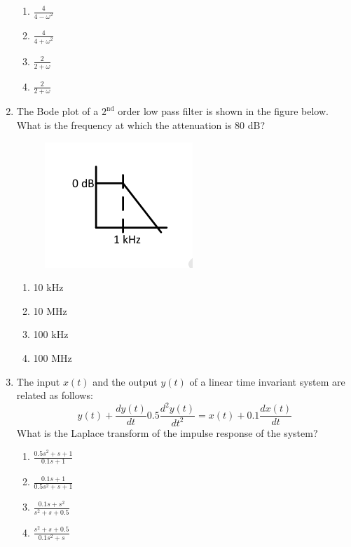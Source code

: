 \documentclass[a4paper,12pt]{exam}
\numberwithin{equation}{enumi}
\numberwithin{figure}{enumi}
\begin{document}
\begin{enumerate}
\hfill{}

\begin{multicols}{4}
\begin{enumerate}
\item $\frac{4}{4 - \omega^2}$
\item$\frac{4}{4 + \omega^2}$
\item $\frac{2}{2 + \omega}$
\item $\frac{2}{2 + \omega}$
\end{enumerate} 
\end{multicols}

\item The Bode plot of a $2^{\text{nd}}$ order low pass filter is shown in the figure below. What is the frequency at which the attenuation is 80 dB?

\begin{figure}[H]
\centering
\includegraphics[width=0.3\columnwidth]{figs/Q23.png}
\label{fig:Q23.png}
\end{figure}

\hfill{}

\begin{enumerate}
\item 10 kHz
\item 10 MHz
\item 100 kHz 
\item 100 MHz
\end{enumerate}  

\item The input $x(t)$ and the output $y(t)$ of a linear time invariant system are related as 
follows: \\[3pt]
\begin{equation*}
y(t) + \frac{dy(t)}{dt} 0.5\frac{d^2y(t)}{dt^2} = x(t) + 0.1\frac{dx(t)}{dt} 
\end{equation*}
What is the Laplace transform of the impulse response of the system? 

\hfill{}

\begin{enumerate}
\item $\frac{0.5s^2 + s + 1}{0.1s + 1}$
\vspace{0.25cm}
\item $\frac{0.1s + 1}{0.5s^2 + s + 1}$
\vspace{0.25cm}
\item $\frac{0.1s + s^2}{s^2 + s + 0.5}$
\vspace{0.25cm}
\item $\frac{s^2 + s + 0.5}{0.1s^2 + s}$
\end{enumerate}  


\end{enumerate}
\end{document}
